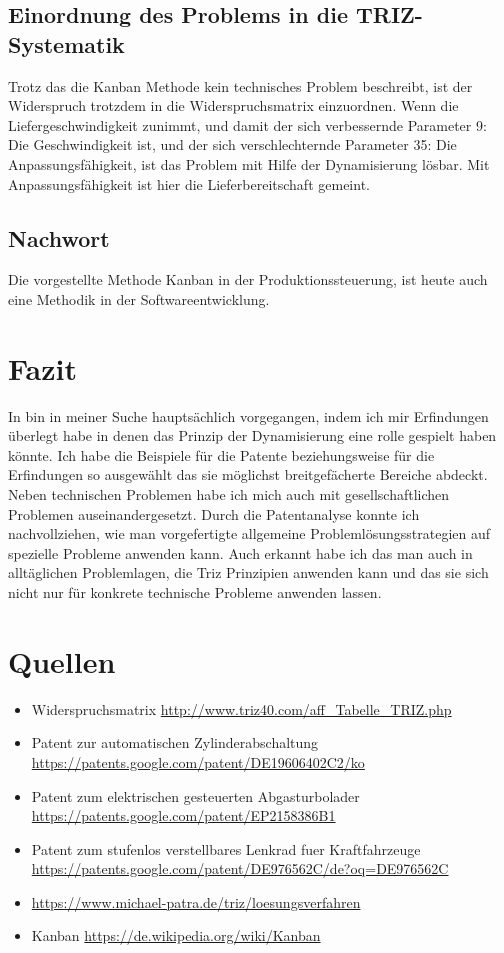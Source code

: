 \documentclass[11pt,a4paper]{article}
\begin{document}
\subsection{Einordnung des Problems in die TRIZ-Systematik}
Trotz das die Kanban Methode kein technisches Problem beschreibt, ist der
Widerspruch trotzdem in die Widerspruchsmatrix einzuordnen.  Wenn die
Liefergeschwindigkeit zunimmt, und damit der sich verbessernde Parameter 9:
Die Geschwindigkeit ist, und der sich verschlechternde Parameter 35: Die
Anpassungsfähigkeit, ist das Problem mit Hilfe der Dynamisierung lösbar.  Mit
Anpassungsfähigkeit ist hier die Lieferbereitschaft gemeint.

\subsection{Nachwort}
Die vorgestellte Methode Kanban in der Produktionssteuerung, ist heute auch
eine Methodik in der Softwareentwicklung.

\section{Fazit}
In bin in meiner Suche hauptsächlich vorgegangen, indem ich mir Erfindungen
überlegt habe in denen das Prinzip der Dynamisierung eine rolle gespielt haben
könnte. Ich habe die Beispiele für die Patente beziehungsweise für die
Erfindungen so ausgewählt das sie möglichst breitgefächerte Bereiche
abdeckt. Neben technischen Problemen habe ich mich auch mit gesellschaftlichen
Problemen auseinandergesetzt.  Durch die Patentanalyse konnte ich
nachvollziehen, wie man vorgefertigte allgemeine Problemlösungsstrategien auf
spezielle Probleme anwenden kann.  Auch erkannt habe ich das man auch in
alltäglichen Problemlagen, die Triz Prinzipien anwenden kann und das sie sich
nicht nur für konkrete technische Probleme anwenden lassen.

\section{Quellen}

\begin{itemize}
\item {Widerspruchsmatrix}
  \url{http://www.triz40.com/aff_Tabelle_TRIZ.php}
\item {Patent zur automatischen Zylinderabschaltung}\\
  \url{https://patents.google.com/patent/DE19606402C2/ko}
\item {Patent zum elektrischen gesteuerten Abgasturbolader}\\
	\url{https://patents.google.com/patent/EP2158386B1}
\item {Patent zum stufenlos verstellbares Lenkrad fuer Kraftfahrzeuge}\\
	\url{https://patents.google.com/patent/DE976562C/de?oq=DE976562C}
\item \url{https://www.michael-patra.de/triz/loesungsverfahren}
\item {Kanban} \url{https://de.wikipedia.org/wiki/Kanban}
\end{itemize}
\end{document}
